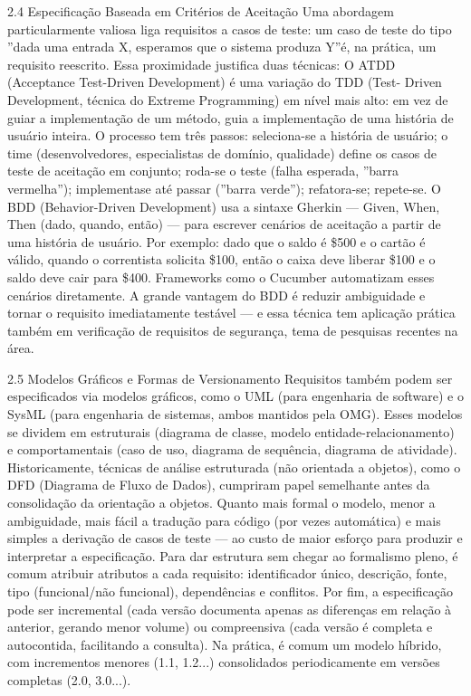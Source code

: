 2.4 Especificação Baseada em Critérios de Aceitação Uma abordagem particularmente valiosa liga requisitos a casos de teste: um caso de teste do tipo ”dada uma entrada X, esperamos que o sistema produza Y”é, na prática, um requisito reescrito. Essa proximidade justifica duas técnicas: O ATDD (Acceptance Test-Driven Development) é uma variação do TDD (Test- Driven Development, técnica do Extreme Programming) em nível mais alto: em vez de guiar a implementação de um método, guia a implementação de uma história de usuário inteira. O processo tem três passos: seleciona-se a história de usuário; o time (desenvolvedores, especialistas de domínio, qualidade) define os casos de teste de aceitação em conjunto; roda-se o teste (falha esperada, ”barra vermelha”); implementase até passar (”barra verde”); refatora-se; repete-se. O BDD (Behavior-Driven Development) usa a sintaxe Gherkin — Given, When, Then (dado, quando, então) — para escrever cenários de aceitação a partir de uma história de usuário. Por exemplo: dado que o saldo é \$500 e o cartão é válido, quando o correntista solicita \$100, então o caixa deve liberar \$100 e o saldo deve cair para \$400. Frameworks como o Cucumber automatizam esses cenários diretamente. A grande vantagem do BDD é reduzir ambiguidade e tornar o requisito imediatamente testável — e essa técnica tem aplicação prática também em verificação de requisitos de segurança, tema de pesquisas recentes na área.

2.5 Modelos Gráficos e Formas de Versionamento Requisitos também podem ser especificados via modelos gráficos, como o UML (para engenharia de software) e o SysML (para engenharia de sistemas, ambos mantidos pela OMG). Esses modelos se dividem em estruturais (diagrama de classe, modelo entidade-relacionamento) e comportamentais (caso de uso, diagrama de sequência, diagrama de atividade). Historicamente, técnicas de análise estruturada (não orientada a objetos), como o DFD (Diagrama de Fluxo de Dados), cumpriram papel semelhante antes da consolidação da orientação a objetos. Quanto mais formal o modelo, menor a ambiguidade, mais fácil a tradução para código (por vezes automática) e mais simples a derivação de casos de teste — ao custo de maior esforço para produzir e interpretar a especificação. Para dar estrutura sem chegar ao formalismo pleno, é comum atribuir atributos a cada requisito: identificador único, descrição, fonte, tipo (funcional/não funcional), dependências e conflitos. Por fim, a especificação pode ser incremental (cada versão documenta apenas as diferenças em relação à anterior, gerando menor volume) ou compreensiva (cada versão é completa e autocontida, facilitando a consulta). Na prática, é comum um modelo híbrido, com incrementos menores (1.1, 1.2...) consolidados periodicamente em versões completas (2.0, 3.0...).

